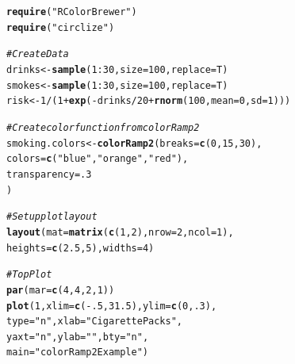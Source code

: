 \documentclass{tufte-book}\usepackage[]{graphicx}\usepackage[]{color}
\makeatletter
\newcommand{\hlnum}[1]{\textcolor[rgb]{0.686,0.059,0.569}{#1}}%
\newcommand{\hlstr}[1]{\textcolor[rgb]{0.192,0.494,0.8}{#1}}%
\newcommand{\hlcom}[1]{\textcolor[rgb]{0.678,0.584,0.686}{\textit{#1}}}%
\newcommand{\hlopt}[1]{\textcolor[rgb]{0,0,0}{#1}}%
\newcommand{\hlstd}[1]{\textcolor[rgb]{0.345,0.345,0.345}{#1}}%
\newcommand{\hlkwb}[1]{\textcolor[rgb]{0.69,0.353,0.396}{#1}}%
\newcommand{\hlkwc}[1]{\textcolor[rgb]{0.333,0.667,0.333}{#1}}%
\newcommand{\hlkwd}[1]{\textcolor[rgb]{0.737,0.353,0.396}{\textbf{#1}}}%
\newenvironment{kframe}{%
 \def\at@end@of@kframe{}%
 \ifinner\ifhmode%
  \def\at@end@of@kframe{\end{minipage}}%
  \begin{minipage}{\columnwidth}%
 \fi\fi%
 \def\FrameCommand##1{\hskip\@totalleftmargin \hskip-\fboxsep
 \colorbox{shadecolor}{##1}\hskip-\fboxsep
     \hskip-\linewidth \hskip-\@totalleftmargin \hskip\columnwidth}%
 \MakeFramed {\advance\hsize-\width
   \@totalleftmargin\z@ \linewidth\hsize
   \@setminipage}}%
 {\par\unskip\endMakeFramed%
 \at@end@of@kframe}
\newenvironment{knitrout}{}{} %
\makeatother
\begin{document}
\begin{marginfigure}
\begin{tiny}
\begin{knitrout}
\color{fgcolor}\begin{kframe}
\begin{alltt}
\hlkwd{require}\hlstd{(}\hlstr{"RColorBrewer"}\hlstd{)}
\hlkwd{require}\hlstd{(}\hlstr{"circlize"}\hlstd{)}

\hlcom{# Create Data}
\hlstd{drinks} \hlkwb{<-} \hlkwd{sample}\hlstd{(}\hlnum{1}\hlopt{:}\hlnum{30}\hlstd{,} \hlkwc{size} \hlstd{=} \hlnum{100}\hlstd{,} \hlkwc{replace} \hlstd{= T)}
\hlstd{smokes} \hlkwb{<-} \hlkwd{sample}\hlstd{(}\hlnum{1}\hlopt{:}\hlnum{30}\hlstd{,} \hlkwc{size} \hlstd{=} \hlnum{100}\hlstd{,} \hlkwc{replace} \hlstd{= T)}
\hlstd{risk} \hlkwb{<-} \hlnum{1} \hlopt{/} \hlstd{(}\hlnum{1} \hlopt{+} \hlkwd{exp}\hlstd{(}\hlopt{-}\hlstd{drinks} \hlopt{/} \hlnum{20} \hlopt{+} \hlkwd{rnorm}\hlstd{(}\hlnum{100}\hlstd{,} \hlkwc{mean} \hlstd{=} \hlnum{0}\hlstd{,} \hlkwc{sd} \hlstd{=} \hlnum{1}\hlstd{)))}

\hlcom{# Create color function from colorRamp2}
\hlstd{smoking.colors} \hlkwb{<-} \hlkwd{colorRamp2}\hlstd{(}\hlkwc{breaks} \hlstd{=} \hlkwd{c}\hlstd{(}\hlnum{0}\hlstd{,} \hlnum{15}\hlstd{,} \hlnum{30}\hlstd{),}
                  \hlkwc{colors} \hlstd{=} \hlkwd{c}\hlstd{(}\hlstr{"blue"}\hlstd{,} \hlstr{"orange"}\hlstd{,} \hlstr{"red"}\hlstd{),}
                  \hlkwc{transparency} \hlstd{=} \hlnum{.3}
                  \hlstd{)}

\hlcom{# Set up plot layout}
\hlkwd{layout}\hlstd{(}\hlkwc{mat} \hlstd{=} \hlkwd{matrix}\hlstd{(}\hlkwd{c}\hlstd{(}\hlnum{1}\hlstd{,} \hlnum{2}\hlstd{),} \hlkwc{nrow} \hlstd{=} \hlnum{2}\hlstd{,} \hlkwc{ncol} \hlstd{=} \hlnum{1}\hlstd{),}
       \hlkwc{heights} \hlstd{=} \hlkwd{c}\hlstd{(}\hlnum{2.5}\hlstd{,} \hlnum{5}\hlstd{),} \hlkwc{widths} \hlstd{=} \hlnum{4}\hlstd{)}

\hlcom{# Top Plot}
\hlkwd{par}\hlstd{(}\hlkwc{mar} \hlstd{=} \hlkwd{c}\hlstd{(}\hlnum{4}\hlstd{,} \hlnum{4}\hlstd{,} \hlnum{2}\hlstd{,} \hlnum{1}\hlstd{))}
\hlkwd{plot}\hlstd{(}\hlnum{1}\hlstd{,} \hlkwc{xlim} \hlstd{=} \hlkwd{c}\hlstd{(}\hlopt{-}\hlnum{.5}\hlstd{,} \hlnum{31.5}\hlstd{),} \hlkwc{ylim} \hlstd{=} \hlkwd{c}\hlstd{(}\hlnum{0}\hlstd{,} \hlnum{.3}\hlstd{),}
     \hlkwc{type} \hlstd{=} \hlstr{"n"}\hlstd{,} \hlkwc{xlab} \hlstd{=} \hlstr{"Cigarette Packs"}\hlstd{,}
     \hlkwc{yaxt} \hlstd{=} \hlstr{"n"}\hlstd{,} \hlkwc{ylab} \hlstd{=} \hlstr{""}\hlstd{,} \hlkwc{bty} \hlstd{=} \hlstr{"n"}\hlstd{,}
     \hlkwc{main} \hlstd{=} \hlstr{"colorRamp2 Example"}\hlstd{)}


\end{alltt}
\end{kframe}
\end{knitrout}
\end{tiny}
\end{marginfigure}
\end{document}

